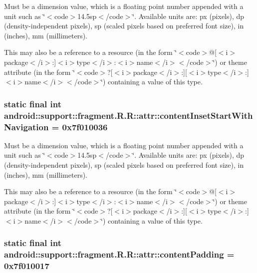 Must be a dimension value, which is a floating point number appended with a unit such as \char`\"{}$<$code$>$14.5sp$<$/code$>$\char`\"{}. Available units are: px (pixels), dp (density-independent pixels), sp (scaled pixels based on preferred font size), in (inches), mm (millimeters). 

This may also be a reference to a resource (in the form \char`\"{}$<$code$>$@\mbox{[}$<$i$>$package$<$/i$>$:\mbox{]}$<$i$>$type$<$/i$>$:$<$i$>$name$<$/i$>$$<$/code$>$\char`\"{}) or theme attribute (in the form \char`\"{}$<$code$>$?\mbox{[}$<$i$>$package$<$/i$>$:\mbox{]}\mbox{[}$<$i$>$type$<$/i$>$:\mbox{]}$<$i$>$name$<$/i$>$$<$/code$>$\char`\"{}) containing a value of this type. \hypertarget{classandroid_1_1support_1_1fragment_1_1_r_1_1attr_23ef5efa1720ead1bcb927aa58a94e3e}{
\subsubsection[{contentInsetStartWithNavigation}]{\setlength{\rightskip}{0pt plus 5cm}static final int android::support::fragment.R.R::attr::contentInsetStartWithNavigation = 0x7f010036}}
\label{classandroid_1_1support_1_1fragment_1_1_r_1_1attr_23ef5efa1720ead1bcb927aa58a94e3e}


Must be a dimension value, which is a floating point number appended with a unit such as \char`\"{}$<$code$>$14.5sp$<$/code$>$\char`\"{}. Available units are: px (pixels), dp (density-independent pixels), sp (scaled pixels based on preferred font size), in (inches), mm (millimeters). 

This may also be a reference to a resource (in the form \char`\"{}$<$code$>$@\mbox{[}$<$i$>$package$<$/i$>$:\mbox{]}$<$i$>$type$<$/i$>$:$<$i$>$name$<$/i$>$$<$/code$>$\char`\"{}) or theme attribute (in the form \char`\"{}$<$code$>$?\mbox{[}$<$i$>$package$<$/i$>$:\mbox{]}\mbox{[}$<$i$>$type$<$/i$>$:\mbox{]}$<$i$>$name$<$/i$>$$<$/code$>$\char`\"{}) containing a value of this type. \hypertarget{classandroid_1_1support_1_1fragment_1_1_r_1_1attr_429616d0a77d51554defe2b53d428fbc}{
\subsubsection[{contentPadding}]{\setlength{\rightskip}{0pt plus 5cm}static final int android::support::fragment.R.R::attr::contentPadding = 0x7f010017}}
\label{classandroid_1_1support_1_1fragment_1_1_r_1_1attr_429616d0a77d51554defe2b53d428fbc}


